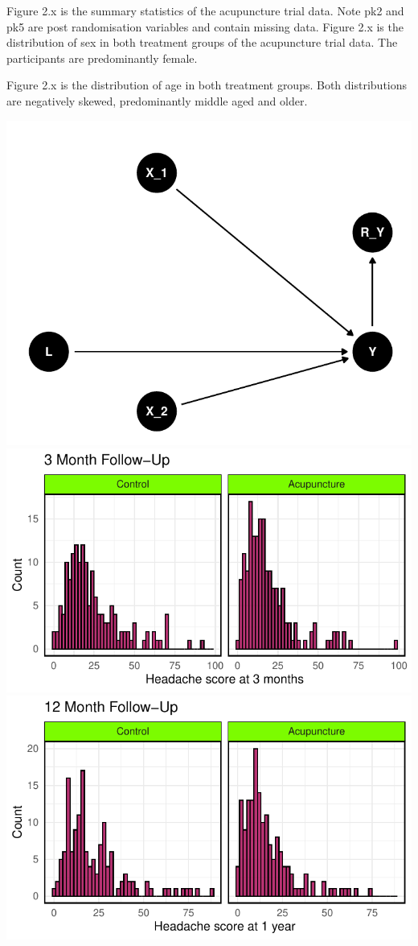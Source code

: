 \documentclass{article}
\begin{document}
Figure 2.x is the summary statistics of the acupuncture trial data. Note
pk2 and pk5 are post randomisation variables and contain missing data.
Figure 2.x is the distribution of sex in both treatment groups of the
acupuncture trial data. The participants are predominantly female.

Figure 2.x is the distribution of age in both treatment groups. Both
distributions are negatively skewed, predominantly middle aged and
older.

\includegraphics{Final_Report_files/figure-latex/unnamed-chunk-4-1.pdf}
\includegraphics{Final_Report_files/figure-latex/unnamed-chunk-4-2.pdf}
\includegraphics{Final_Report_files/figure-latex/unnamed-chunk-4-3.pdf}
\end{document}
